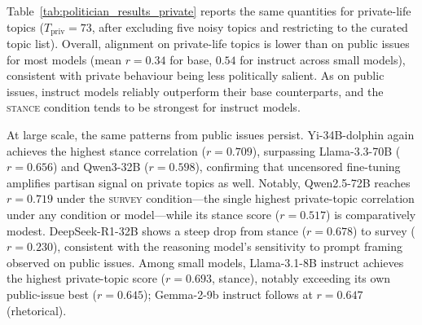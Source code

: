 Table~\ref{tab:politician_results_private} reports the same quantities for private-life topics ($T_\text{priv} = 73$, after excluding five noisy topics and restricting to the curated topic list). Overall, alignment on private-life topics is lower than on public issues for most models (mean $r = 0.34$ for base, $0.54$ for instruct across small models), consistent with private behaviour being less politically salient. As on public issues, instruct models reliably outperform their base counterparts, and the \textsc{stance} condition tends to be strongest for instruct models.

At large scale, the same patterns from public issues persist. Yi-34B-dolphin again achieves the highest stance correlation ($r = 0.709$), surpassing Llama-3.3-70B ($r = 0.656$) and Qwen3-32B ($r = 0.598$), confirming that uncensored fine-tuning amplifies partisan signal on private topics as well. Notably, Qwen2.5-72B reaches $r = 0.719$ under the \textsc{survey} condition---the single highest private-topic correlation under any condition or model---while its stance score ($r = 0.517$) is comparatively modest. DeepSeek-R1-32B shows a steep drop from stance ($r = 0.678$) to survey ($r = 0.230$), consistent with the reasoning model's sensitivity to prompt framing observed on public issues. Among small models, Llama-3.1-8B instruct achieves the highest private-topic score ($r = 0.693$, stance), notably exceeding its own public-issue best ($r = 0.645$); Gemma-2-9b instruct follows at $r = 0.647$ (rhetorical).

